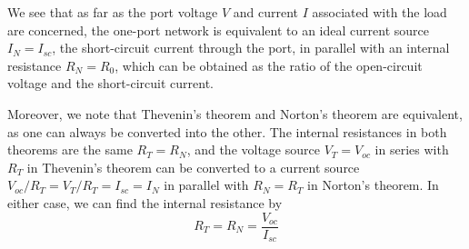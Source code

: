 \begin{itemize}
\begin{itemize}
  \end{itemize}

  We see that as far as the port voltage $V$ and current $I$ associated 
  with the load are concerned, the one-port network is equivalent to an 
  ideal current source $I_N=I_{sc}$, the short-circuit current through the 
  port, in parallel with an internal resistance $R_N=R_0$, which can be 
  obtained as the ratio of the open-circuit voltage and the short-circuit 
  current.

  Moreover, we note that Thevenin's theorem and Norton's theorem are 
  equivalent, as one can always be converted into the other. The internal 
  resistances in both theorems are the same $R_T=R_N$, and the voltage 
  source $V_T=V_{oc}$ in series with $R_T$ in Thevenin's theorem can be 
  converted to a current source $V_{oc}/R_T=V_T/R_T=I_{sc}=I_N$ in parallel 
  with $R_N=R_T$ in Norton's theorem. In either case, we can find the 
  internal resistance by
  \[
  R_T=R_N=\frac{V_{oc}}{I_{sc}}
  \]

\begin{comment}

{\bf Load Line and Output Resistance}

Due to Thevenin's and Norton's theorems, any one-port network of 
resistors and energy sources can be converted into a simple voltage or 
current source with an internal or output resistance $R_0$. Moreover, 
the relationship between the voltage $V$ across and the current $I$ 
through the load is a straight line referred to as the {\bf load line}.
The absolute value of the slope $|\triangle V/\triangle I|=R_0$ of the
load line is the internal or output resistance of the network, as shown
in the figure below. On the other hand, the resistance $R_L$, which 
can be considered as the input resistance of the load, can also be 
represented on the graph as a straight line with its slope 
$\triangle V/\triangle I=R_L$. The intersection of these two straight
lines indicates the actual voltage $V$ and current $I$ with the load 
$R_L$.

\htmladdimg{../figures/loadline.gif}

The output resistance $R_0$ of a network can also be determined 
experimentally by varying the load $R_L$. Assume $(V_1, I_1)$ are 
associated with load $R_1$ and $(V_2, I_2)$ with load $R_2$, then 
the output resistance of the source network can be found to be:

\[ R_0=-\frac{\triangle V}{\triangle I}=-\frac{V_1-V_2}{I_1-I_2} \]


\end{comment}
\end{itemize}
